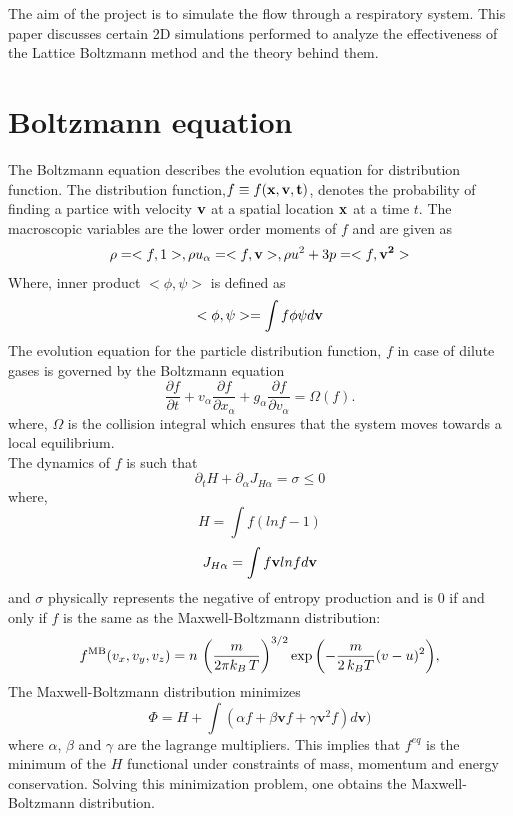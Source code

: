 \documentclass[titlepage,a4paper,10pt]{article}
\begin{document}
The aim of the project is to simulate the flow through a respiratory system. This paper discusses certain 2D simulations performed to analyze the effectiveness of the Lattice Boltzmann method and the theory behind them.
\section{Boltzmann equation}
The Boltzmann equation describes the evolution equation for distribution function. The distribution function,$f \equiv f(\bf x,\bf v, t)$, denotes the probability of finding a partice with velocity $\bf v$ at a spatial location $\bf x$ at a time $t$. The macroscopic variables are the lower order moments of $f$ and are given as
\begin{equation}
\begin{aligned}
\rho = <f,1> , \rho u_\alpha = <f,\textbf{v}>, \rho u^2 + 3p = <f, \bf v^2>
\end{aligned}
\end{equation}
Where, inner product $<\phi,\psi>$ is defined as
\[ <\phi,\psi> = \int f\phi\psi d\bf v \]
The evolution equation for the particle distribution function, $f$ in case of dilute gases is governed by the Boltzmann equation
\begin{equation}
 \frac{\partial f}{\partial t}+v_{\alpha}\frac{\partial f}{\partial x_{\alpha}}+
 g_{\alpha} \frac{\partial f}{\partial v_{\alpha}}
 = \Omega(f).
 \end{equation}
where, $\Omega$ is the collision integral which ensures that the system moves towards a local equilibrium.
\\

The dynamics of $f$ is such that 
\begin{equation} \partial_tH + \partial_{\alpha}J_{H\alpha} = \sigma\le0 \end{equation}
where, 
\[ H = \int f(lnf - 1) \]
\[ J_{H\alpha} = \int f\textbf{v} lnfd\bf v \]
and $\sigma$ physically represents the negative of entropy production and is $0$ if and only if $f$ is the same as the Maxwell-Boltzmann distribution:
\begin{equation}
   f^{\rm MB}(v_x, v_y,v_z) = n\,\left(\frac{m}{2 \pi k_B \,T } \right)^{3/2} \exp{\left(-\frac{m}{2\, k_B T} (v-u)^2 \right)},
\end{equation}
The Maxwell-Boltzmann distribution minimizes 
\[ \Phi = H + \int(\alpha f + \beta \textbf{v}f + \gamma \textbf{v}^2 f)d\textbf{v}) \]
where $\alpha$, $\beta$ and $\gamma$ are the lagrange multipliers. This implies that $f^{eq}$ is the minimum of the $H$ functional under constraints of mass, momentum and energy conservation. Solving this minimization problem, one obtains the Maxwell-Boltzmann distribution.
\end{document}
